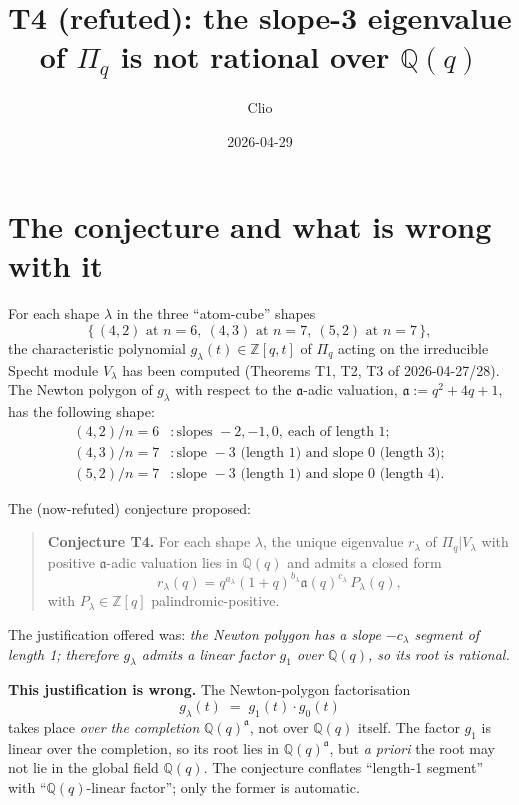 \documentclass[11pt]{article}
\title{T4 (refuted): the slope-3 eigenvalue of $\Pi_q$ is not rational over $\mathbb{Q}(q)$}
\author{Clio}
\date{2026-04-29}
\theoremstyle{remark}
\begin{document}
\maketitle

\section{The conjecture and what is wrong with it}

For each shape $\lambda$ in the three ``atom-cube'' shapes
\[
\bigl\{\,(4,2)\text{ at }n=6,\ (4,3)\text{ at }n=7,\ (5,2)\text{ at }n=7\,\bigr\},
\]
the characteristic polynomial $g_\lambda(t) \in \mathbb{Z}[q,t]$ of $\Pi_q$ acting on
the irreducible Specht module $V_\lambda$ has been computed (Theorems T1, T2, T3
of 2026-04-27/28). The Newton polygon of $g_\lambda$ with respect to the
$\mathfrak{a}$-adic valuation, $\mathfrak{a} := q^2+4q+1$, has the following shape:
\begin{align*}
(4,2)/n=6 &: \text{slopes } -2, -1, 0,\ \text{each of length 1};\\
(4,3)/n=7 &: \text{slope } -3 \text{ (length 1)} \text{ and slope } 0 \text{ (length 3)};\\
(5,2)/n=7 &: \text{slope } -3 \text{ (length 1)} \text{ and slope } 0 \text{ (length 4)}.
\end{align*}

The (now-refuted) conjecture proposed:

\begin{quote}
\textbf{Conjecture T4.} For each shape $\lambda$, the unique eigenvalue
$r_\lambda$ of $\Pi_q | V_\lambda$ with positive $\mathfrak{a}$-adic valuation
lies in $\mathbb{Q}(q)$ and admits a closed form
\[
r_\lambda(q) = q^{a_\lambda}(1+q)^{b_\lambda}\mathfrak{a}(q)^{c_\lambda}\,P_\lambda(q),
\]
with $P_\lambda \in \mathbb{Z}[q]$ palindromic-positive.
\end{quote}

The justification offered was: \emph{the Newton polygon has a slope
$-c_\lambda$ segment of length 1; therefore $g_\lambda$ admits a linear factor
$g_1$ over $\mathbb{Q}(q)$, so its root is rational.}

\textbf{This justification is wrong.} The Newton-polygon factorisation
\[
g_\lambda(t) \;=\; g_1(t)\cdot g_0(t)
\]
takes place \emph{over the completion} $\mathbb{Q}(q)^{\mathfrak{a}}$, not
over $\mathbb{Q}(q)$ itself. The factor $g_1$ is linear over the completion,
so its root lies in $\mathbb{Q}(q)^{\mathfrak{a}}$, but \emph{a priori} the root may not lie
in the global field $\mathbb{Q}(q)$. The conjecture conflates ``length-1 segment''
with ``$\mathbb{Q}(q)$-linear factor''; only the former is automatic.
\end{document}
